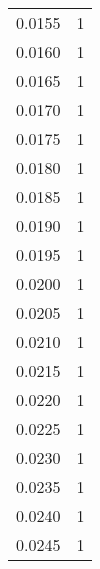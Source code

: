 \begin{tabular}{rr}
           0.0155 &                    1 \\
           0.0160 &                    1 \\
           0.0165 &                    1 \\
           0.0170 &                    1 \\
           0.0175 &                    1 \\
           0.0180 &                    1 \\
           0.0185 &                    1 \\
           0.0190 &                    1 \\
           0.0195 &                    1 \\
           0.0200 &                    1 \\
           0.0205 &                    1 \\
           0.0210 &                    1 \\
           0.0215 &                    1 \\
           0.0220 &                    1 \\
           0.0225 &                    1 \\
           0.0230 &                    1 \\
           0.0235 &                    1 \\
           0.0240 &                    1 \\
           0.0245 &                    1 \\
\bottomrule
\end{tabular}
